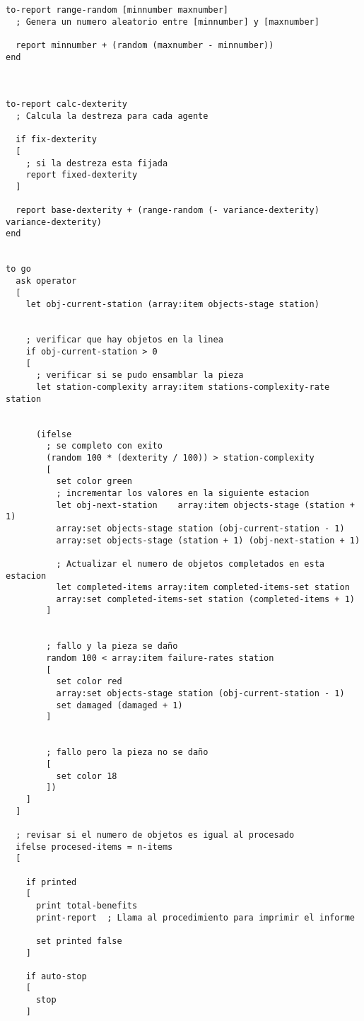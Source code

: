 \documentclass[11pt]{article}
\begin{document}
\begin{verbatim}
to-report range-random [minnumber maxnumber]
  ; Genera un numero aleatorio entre [minnumber] y [maxnumber]

  report minnumber + (random (maxnumber - minnumber))
end



to-report calc-dexterity
  ; Calcula la destreza para cada agente

  if fix-dexterity
  [
    ; si la destreza esta fijada
    report fixed-dexterity
  ]

  report base-dexterity + (range-random (- variance-dexterity) variance-dexterity)
end


to go
  ask operator
  [
    let obj-current-station (array:item objects-stage station)


    ; verificar que hay objetos en la linea
    if obj-current-station > 0
    [
      ; verificar si se pudo ensamblar la pieza
      let station-complexity array:item stations-complexity-rate station


      (ifelse
        ; se completo con exito
        (random 100 * (dexterity / 100)) > station-complexity
        [
          set color green
          ; incrementar los valores en la siguiente estacion
          let obj-next-station    array:item objects-stage (station + 1)
          array:set objects-stage station (obj-current-station - 1)
          array:set objects-stage (station + 1) (obj-next-station + 1)

          ; Actualizar el numero de objetos completados en esta estacion
          let completed-items array:item completed-items-set station
          array:set completed-items-set station (completed-items + 1)
        ]


        ; fallo y la pieza se daño
        random 100 < array:item failure-rates station
        [
          set color red
          array:set objects-stage station (obj-current-station - 1)
          set damaged (damaged + 1)
        ]


        ; fallo pero la pieza no se daño
        [
          set color 18
        ])
    ]
  ]

  ; revisar si el numero de objetos es igual al procesado
  ifelse procesed-items = n-items
  [

    if printed
    [
      print total-benefits
      print-report  ; Llama al procedimiento para imprimir el informe

      set printed false
    ]

    if auto-stop
    [
      stop
    ]



\end{verbatim}
\end{document}

